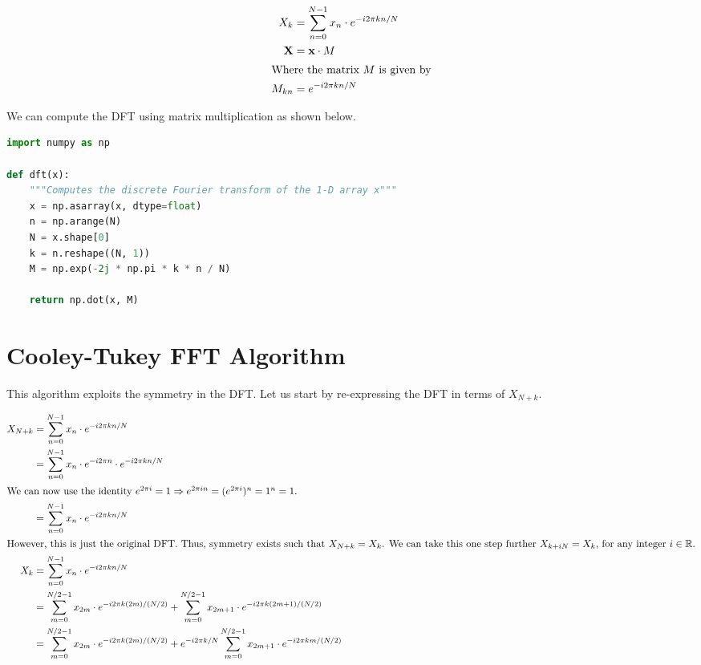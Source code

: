 \documentclass{article}
\begin{document}
\begin{align*}
    X_k &= \sum_{n=0}^{N-1} x_n \cdot e^{-i 2 \pi k n / N}\\
    \textbf{X} &= \textbf{x} \cdot M\\
    \intertext{Where the matrix $M$ is given by}
    M_{kn} &= e^{-i 2 \pi k n / N}
\end{align*}

\newpage
\thispagestyle{fancy}
We can compute the DFT using matrix multiplication as shown below.
\begin{lstlisting}[language=Python, caption=Na\"{i}ve implementation of the DFT]
import numpy as np

def dft(x):
    """Computes the discrete Fourier transform of the 1-D array x"""
    x = np.asarray(x, dtype=float)
    n = np.arange(N)
    N = x.shape[0]
    k = n.reshape((N, 1))
    M = np.exp(-2j * np.pi * k * n / N)

    return np.dot(x, M)
\end{lstlisting}


\section*{Cooley-Tukey FFT Algorithm}
This algorithm exploits the symmetry in the DFT. Let us start by re-expressing the DFT in terms of $X_{N+k}$.\vspace{-1em}

\begin{align*}
    X_{N+k} &= \sum_{n=0}^{N-1} x_n \cdot e^{-i 2 \pi k n / N}\\
    &= \sum_{n=0}^{N-1} x_n \cdot e^{-i 2\pi n} \cdot e^{-i 2\pi k n / N}\\
    \intertext{We can now use the identity $e^{ 2\pi i} = 1 \Rightarrow e^{2\pi i n} = (e^{2\pi i})^n = 1^n = 1$.}
    &= \sum_{n=0}^{N-1} x_n \cdot e^{-i 2\pi k n / N}\\
    \intertext{However, this is just the original DFT. Thus, symmetry exists such that $X_{N+k} = X_k$. We can take this one step further $X_{k + iN} = X_k$, for any integer $i \in \mathbb{R}$.}
    X_k &= \sum_{n=0}^{N-1} x_n \cdot e^{-i 2\pi k n/N}\\
    &= \sum_{m=0}^{N/2 - 1} x_{2m} \cdot e^{-i2\pi k(2m)/(N/2)} + \sum_{m=0}^{N/2 - 1} x_{2m + 1} \cdot e^{-i2\pi k(2m + 1)/ (N/2)}\\
    &= \sum_{m=0}^{N/2 - 1} x_{2m} \cdot e^{-i2\pi k(2m)/(N/2)} + e^{-i 2\pi k/N} \sum_{m=0}^{N/2 - 1} x_{2m + 1} \cdot e^{-i2\pi k  m/ (N/2)}\\
\end{align*}
\end{document}
